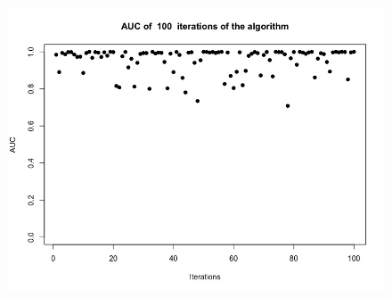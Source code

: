 \documentclass{article}
\begin{document}
\begin{figure}
\includegraphics[width=5in]{images/AUC_100_iter.jpeg}
\end{figure}
\end{document}
